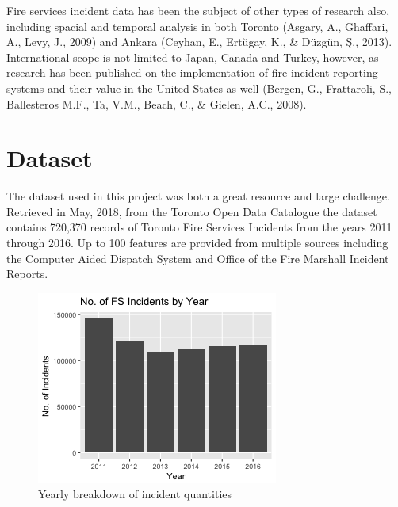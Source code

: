 \documentclass[12pt,letterpaper, oneside]
{article}
\begin{document}
Fire services incident data has been the subject of other types of research also, including spacial and temporal analysis in both Toronto (Asgary, A., Ghaffari, A., Levy, J., 2009) and Ankara (Ceyhan, E., Ertŭgay, K., \& Düzgün, Ş., 2013). International scope is not limited to Japan, Canada and Turkey, however, as research has been published on the implementation of fire incident reporting systems and their value in the United States as well (Bergen, G., Frattaroli, S., Ballesteros M.F., Ta, V.M., Beach, C., \& Gielen, A.C., 2008).

\section{Dataset}

The dataset used in this project was both a great resource and large challenge. Retrieved in May, 2018, from the Toronto Open Data Catalogue the dataset contains 720,370 records of Toronto Fire Services Incidents from the years 2011 through 2016. Up to 100 features are provided from multiple sources including the Computer Aided Dispatch System and Office of the Fire Marshall Incident Reports. 

\begin{figure}
	\centering
	\includegraphics[width=\textwidth]{Incidents_by_year}
	\caption{Yearly breakdown of incident quantities
		\label{fig:yearly}
	}
	
\end{figure} 
\end{document}
